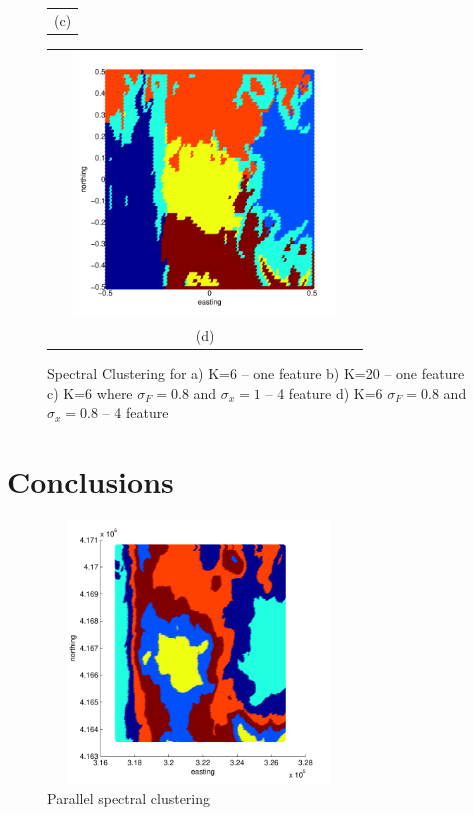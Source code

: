 \documentclass[12pt,letterpaper]{article}
\begin{document}
\begin{figure}[H]
\begin{minipage}[b]{0.5\textwidth}
\begin{tabular}{c}
      (c)
    \end{tabular}
  \end{minipage}
  \begin{minipage}{0.5\textwidth}
    \begin{tabular}{c}
      \includegraphics[width=8cm,height=7cm,keepaspectratio]{figs/Spectral1.pdf}\\
      (d)
    \end{tabular}
  \end{minipage}
   \caption{Spectral Clustering for a) K=6 -- one feature b) K=20 -- one feature c) K=6  where $\sigma_F = 0.8$ and $\sigma_x = 1$ -- 4 feature d) K=6  $\sigma_F = 0.8$ and $\sigma_x = 0.8$ -- 4 feature}\label{fig:fig4}
\end{figure}



\section{Conclusions}

\begin{figure}[H]
\begin{centering}
 \includegraphics[width=8cm,height=7cm,keepaspectratio]{figs/Spectral_parallel.pdf}
 \caption{Parallel spectral clustering}
 \end{centering}
 \end{figure}
\end{document}
